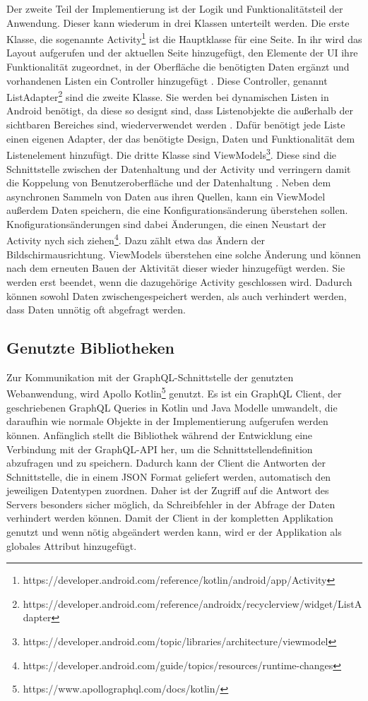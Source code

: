Der zweite Teil der Implementierung ist der Logik und Funktionalitätsteil der Anwendung. Dieser kann wiederum in drei Klassen unterteilt werden. 
Die erste Klasse, die sogenannte Activity\footnote{https://developer.android.com/reference/kotlin/android/app/Activity} ist die Hauptklasse für eine Seite. In ihr wird das Layout aufgerufen und der aktuellen Seite hinzugefügt, den Elemente der UI ihre Funktionalität zugeordnet, in der Oberfläche die benötigten Daten ergänzt und vorhandenen Listen ein Controller hinzugefügt \cite{sarkar_android}.
Diese Controller, genannt ListAdapter\footnote{https://developer.android.com/reference/androidx/recyclerview/widget/ListAdapter} sind die zweite Klasse. Sie werden bei dynamischen Listen in Android benötigt, da diese so designt sind, dass Listenobjekte die außerhalb der sichtbaren Bereiches sind, wiederverwendet werden \cite{recyclerview_android}. Dafür benötigt jede Liste einen eigenen Adapter, der das benötigte Design, Daten und Funktionalität dem Listenelement hinzufügt.
Die dritte Klasse sind ViewModels\footnote{https://developer.android.com/topic/libraries/architecture/viewmodel}. Diese sind die Schnittstelle zwischen der Datenhaltung und der Activity und verringern damit die Koppelung von Benutzeroberfläche und der Datenhaltung \cite{viewModel_android}. Neben dem asynchronen Sammeln von Daten aus ihren Quellen, kann ein ViewModel außerdem Daten speichern, die eine Konfigurationsänderung überstehen sollen. Knofigurationsänderungen sind dabei Änderungen, die einen Neustart der Activity nych sich ziehen\footnote{https://developer.android.com/guide/topics/resources/runtime-changes}. Dazu zählt etwa das Ändern der Bildschirmausrichtung. ViewModels überstehen eine solche Änderung und können nach dem erneuten Bauen der Aktivität dieser wieder hinzugefügt werden. Sie werden erst beendet, wenn die dazugehörige Activity geschlossen wird. Dadurch können sowohl Daten zwischengespeichert werden, als auch verhindert werden, dass Daten unnötig oft abgefragt werden.


\subsection{Genutzte Bibliotheken}
Zur Kommunikation mit der GraphQL-Schnittstelle der genutzten Webanwendung, wird Apollo Kotlin\footnote{https://www.apollographql.com/docs/kotlin/} genutzt. 
Es ist ein GraphQL Client, der geschriebenen GraphQL Queries in Kotlin und Java Modelle umwandelt, die daraufhin wie normale Objekte in der Implementierung aufgerufen werden können.
Anfänglich stellt die Bibliothek während der Entwicklung eine Verbindung mit der GraphQL-API her, um die Schnittstellendefinition abzufragen und zu speichern. Dadurch kann der Client die Antworten der Schnittstelle, die in einem JSON Format geliefert werden, automatisch den jeweiligen Datentypen zuordnen. Daher ist der Zugriff auf die Antwort des Servers besonders sicher möglich, da Schreibfehler in der Abfrage der Daten verhindert werden können.
Damit der Client in der kompletten Applikation genutzt und wenn nötig abgeändert werden kann, wird er der Applikation als globales Attribut hinzugefügt.

